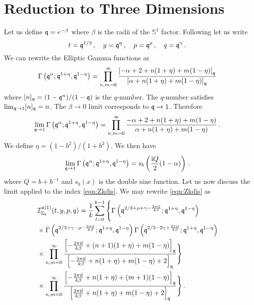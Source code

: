 \documentclass[main.tex]{subfiles}
\begin{document}
\section{Reduction to Three Dimensions}
Let us define $\mathfrak{q}=e^{-\beta}$ where $\beta$ is the radii of the $\mathbb{S}^1$ factor. Following \cite{Gadde:2011ia,Dolan:2011rp,Rastelli:2016tbz} let us write
\begin{equation}
t=\mathfrak{q}^{1/3}\,,\quad y=\mathfrak{q}^{\eta}\,,\quad p=\mathfrak{q}^{\rho}\,,\quad q=\mathfrak{q}^{\gamma}\,.
\end{equation}
We can rewrite the Elliptic Gamma functions as
\begin{equation}
\Gamma\left(\mathfrak{q}^{\alpha};\mathfrak{q}^{1+\eta},\mathfrak{q}^{1-\eta}\right)=\prod_{n,m=0}^{\infty}\frac{\left[-\alpha+2+n(1+\eta)+m(1-\eta)\right]_{\mathfrak{q}}}{\left[\alpha+n(1+\eta)+m(1-\eta)\right]_{\mathfrak{q}}}
\end{equation}
where $[n]_{\mathfrak{q}}=(1-\mathfrak{q}^n)/(1-\mathfrak{q})$ is the $q$-number. The $q$-number satisfies $\lim_{\mathfrak{q}\to1}[n]_{\mathfrak{q}}=n$. The $\beta\to0$ limit corresponds to $\mathfrak{q}\to1$. Therefore
\begin{equation}
\lim_{\mathfrak{q}\to1}\Gamma\left(\mathfrak{q}^{\alpha};\mathfrak{q}^{1+\eta},\mathfrak{q}^{1-\eta}\right)=\prod_{n,m=0}^{\infty}\frac{-\alpha+2+n(1+\eta)+m(1-\eta)}{\alpha+n(1+\eta)+m(1-\eta)}\,.
\end{equation}
We define $\eta=(1-b^2)/(1+b^2)$. We then have
\begin{equation}\label{eqn:Gammalimit}
\lim_{\mathfrak{q}\to1}\Gamma\left(\mathfrak{q}^{\alpha};\mathfrak{q}^{1+\eta},\mathfrak{q}^{1-\eta}\right)=s_b\left(\frac{\mathrm{i} Q}{2}(1-\alpha)\right)\,.
\end{equation}
where $Q=b+b^{-1}$ and $s_b(x)$ is the double sine function.
Let us now discuss the limit applied to the index \eqref{eqn:Zkdis}. We may rewrite \eqref{eqn:Zkdis} as
\begin{equation}
\begin{aligned}
&\mathcal{I}^{\mathfrak{u}(1)}_{\mathbb{Z}_k}(t,y,p,q)=\frac{1}{k}\sum_{l=0}^{k-1}\Bigg\{\Gamma\left(\mathfrak{q}^{2/3+\rho+\gamma-\frac{2\pi\mathrm{i} l}{k\beta}};\mathfrak{q}^{1+\eta},\mathfrak{q}^{1-\eta}\right)\\
&\times\Gamma\left(\mathfrak{q}^{2/3+\gamma-\rho-\frac{2\pi\mathrm{i} l}{k\beta}};\mathfrak{q}^{1+\eta},\mathfrak{q}^{1-\eta}\right)\Gamma\left(\mathfrak{q}^{2/3-2\gamma+\frac{2\pi\mathrm{i} l}{k\beta}};\mathfrak{q}^{1+\eta},\mathfrak{q}^{1-\eta}\right)\\
&\times\prod_{n,m=0}^{\infty}\frac{\left[-\frac{2\pi\mathrm{i} l}{k\beta}+(n+1)(1+\eta)+m(1-\eta)\right]_{\mathfrak{q}}}{\left[-\frac{2\pi\mathrm{i} l}{k\beta}+n(1+\eta)+m(1-\eta)+2\right]_{\mathfrak{q}}}\Bigg\}\\
&\times\prod_{n,m=0}^{\infty}\frac{\left[-\frac{2\pi\mathrm{i} l}{k\beta}+n(1+\eta)+(m+1)(1-\eta)\right]_{\mathfrak{q}}}{\left[\frac{2\pi\mathrm{i} l}{k\beta}+n(1+\eta)+m(1-\eta)+2\right]_{\mathfrak{q}}}\Bigg\}\,.
\end{aligned}
\end{equation}
\end{document}
